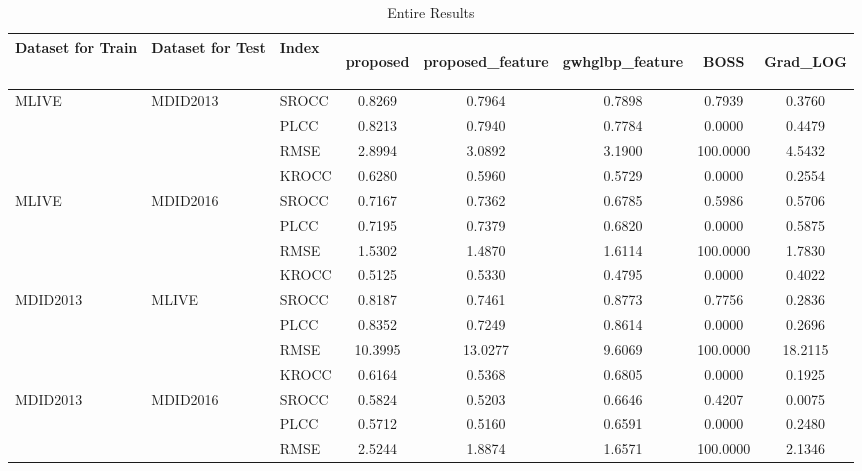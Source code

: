 \documentclass{article}
\begin{document}
\begin{table}
\scriptsize
\caption{Entire Results}
\label{tbl:whole}
\begin{tabular}{||l|l|l||ccccc||}
\toprule
\toprule
\textbf{Dataset for Train}&\textbf{Dataset for Test}&\textbf{Index}&\begin{turn}{-90}\textbf{proposed}\end{turn}&\begin{turn}{-90}\textbf{proposed\_feature}\end{turn}&\begin{turn}{-90}\textbf{gwhglbp\_feature}\end{turn}&\begin{turn}{-90}\textbf{BOSS}\end{turn}&\begin{turn}{-90}\textbf{Grad\_LOG}\end{turn}\\
\midrule
\midrule
\multirow{4}{*}{MLIVE}&\multirow{4}{*}{MDID2013}&SROCC&0.8269&0.7964&0.7898&0.7939&0.3760\\
\cmidrule{3-8}
&&PLCC&0.8213&0.7940&0.7784&0.0000&0.4479\\
\cmidrule{3-8}
&&RMSE&2.8994&3.0892&3.1900&100.0000&4.5432\\
\cmidrule{3-8}
&&KROCC&0.6280&0.5960&0.5729&0.0000&0.2554\\
\midrule
\multirow{4}{*}{MLIVE}&\multirow{4}{*}{MDID2016}&SROCC&0.7167&0.7362&0.6785&0.5986&0.5706\\
\cmidrule{3-8}
&&PLCC&0.7195&0.7379&0.6820&0.0000&0.5875\\
\cmidrule{3-8}
&&RMSE&1.5302&1.4870&1.6114&100.0000&1.7830\\
\cmidrule{3-8}
&&KROCC&0.5125&0.5330&0.4795&0.0000&0.4022\\
\midrule
\multirow{4}{*}{MDID2013}&\multirow{4}{*}{MLIVE}&SROCC&0.8187&0.7461&0.8773&0.7756&0.2836\\
\cmidrule{3-8}
&&PLCC&0.8352&0.7249&0.8614&0.0000&0.2696\\
\cmidrule{3-8}
&&RMSE&10.3995&13.0277&9.6069&100.0000&18.2115\\
\cmidrule{3-8}
&&KROCC&0.6164&0.5368&0.6805&0.0000&0.1925\\
\midrule
\multirow{4}{*}{MDID2013}&\multirow{4}{*}{MDID2016}&SROCC&0.5824&0.5203&0.6646&0.4207&0.0075\\
\cmidrule{3-8}
&&PLCC&0.5712&0.5160&0.6591&0.0000&0.2480\\
\cmidrule{3-8}
&&RMSE&2.5244&1.8874&1.6571&100.0000&2.1346\\

\end{tabular}
\end{table}
\end{document}
